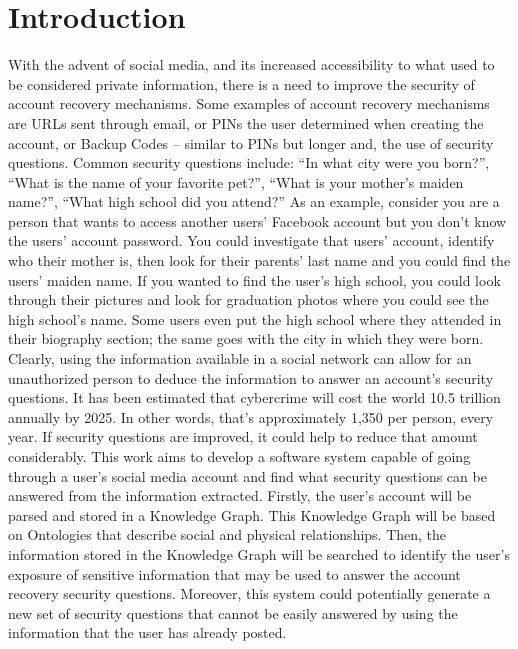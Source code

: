 \documentclass[conference]{IEEEtran}
\begin{document}
\section{Introduction}
With the advent of social media, and its increased accessibility to what used to be considered private information, there is a need to improve the security of account recovery mechanisms. Some examples of account recovery mechanisms are URLs sent through email, or PINs the user determined when creating the account, or Backup Codes – similar to PINs but longer and, the use of security questions. Common security questions include: “In what city were you born?”, “What is the name of your favorite pet?”, “What is your mother’s maiden name?”, “What high school did you attend?” As an example, consider you are a person that wants to access another users’ Facebook account but you don’t know the users’ account password. You could investigate that users’ account, identify who their mother is, then look for their parents’ last name and you could find the users’ maiden name. If you wanted to find the user’s high school, you could look through their pictures and look for graduation photos where you could see the high school’s name. Some users even put the high school where they attended in their biography section; the same goes with the city in which they were born. Clearly, using the information available in a social network can allow for an unauthorized person to deduce the information to answer an account’s security questions. It has been estimated that cybercrime will cost the world 10.5 trillion annually by 2025. In other words, that’s approximately 1,350 per person, every year. If security questions are improved, it could help to reduce that amount considerably.  
	This work aims to develop a software system capable of going through a user’s social media account and find what security questions can be answered from the information extracted. Firstly, the user’s account will be parsed and stored in a Knowledge Graph. This Knowledge Graph will be based on Ontologies that describe social and physical relationships. Then, the information stored in the Knowledge Graph will be searched to identify the user’s exposure of sensitive information that may be used to answer the account recovery security questions. Moreover, this system could potentially generate a new set of security questions that cannot be easily answered by using the information that the user has already posted. 
\end{document}
